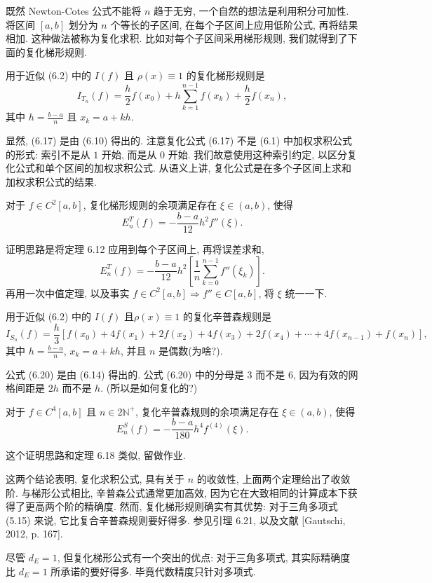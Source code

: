 \documentclass[a4paper]{ctexart}
\newcommand{\hl}[1]
{\noindent {\bf {#1}}}
\begin{document}
{既然 Newton-Cotes 公式不能将 $n$ 趋于无穷, 一个自然的想法是利用积分可加性. 
将区间 $[a, b]$ 划分为 $n$ 个等长的子区间, 在每个子区间上应用低阶公式, 再将结果相加. 这种做法被称为复化求积. 
比如对每个子区间采用梯形规则, 我们就得到了下面的复化梯形规则.

\hl{定义6.17} 用于近似 (6.2) 中的 $I(f)$ 且 $\rho(x) \equiv 1$ 的复化梯形规则是
$$
I_{T_n}(f) = \frac{h}{2} f(x_0) + h \sum_{k=1}^{n-1} f(x_k) + \frac{h}{2} f(x_n), 
$$
其中 $h = \frac{b - a}{n}$ 且 $x_k = a + kh$.

显然, (6.17) 是由 (6.10) 得出的. 注意复化公式 (6.17) 不是 (6.1) 中加权求积公式的形式: 
索引不是从 $1$ 开始, 而是从 $0$ 开始. 我们故意使用这种索引约定, 以区分复化公式和单个区间的加权求积公式. 
从语义上讲, 复化公式是在多个子区间上求和加权求积公式的结果. 

\hl{定理6.18} 对于 $f \in C^2[a, b]$, 复化梯形规则的余项满足存在 $\xi \in (a, b)$, 使得
$$ 
E^T_n(f) = -\frac{b - a}{12}h^2 f''(\xi). 
$$

证明思路是将定理 6.12 应用到每个子区间上, 再将误差求和, 
$$
E^T_n(f) = -\frac{b - a}{12}h^2 \left[ \frac{1}{n} \sum_{k=0}^{n-1} f''(\xi_k) \right]. 
$$
再用一次中值定理, 以及事实 $f \in C^2[a, b] \Rightarrow f'' \in C[a, b]$, 
将 $\xi$ 统一一下.

\hl{定义6.19} 用于近似 (6.2) 中的 $I(f)$ 且$\rho(x) \equiv 1$ 的复化辛普森规则是
$$ 
I_{S_n}(f) 
= \frac{h}{3} \left[ f(x_0) + 4f(x_1) + 2f(x_2) + 4f(x_3) + 2f(x_4) 
+ \cdots + 4f(x_{n-1}) + f(x_n) \right], 
$$
其中 $h = \frac{b - a}{n}$, $x_k = a + kh$, 并且 $n$ 是偶数(为啥?).

公式 (6.20) 是由 (6.14) 得出的. 公式 (6.20) 中的分母是 $3$ 而不是 $6$, 
因为有效的网格间距是 $2h$ 而不是 $h$. (所以是如何复化的?)

\hl{定理6.20} 对于 $f \in C^4[a, b]$ 且 $n \in 2\mathbb{N}^+$, 
复化辛普森规则的余项满足存在 $\xi \in (a, b)$, 使得
$$ 
E^S_n(f) = -\frac{b - a}{180}h^4 f^{(4)}(\xi). 
$$

这个证明思路和定理 6.18 类似, 留做作业. 

这两个结论表明, 复化求积公式, 具有关于 $n$ 的收敛性, 上面两个定理给出了收敛阶.
与梯形公式相比, 辛普森公式通常更加高效, 因为它在大致相同的计算成本下获得了更高两个阶的精确度. 
然而, 复化梯形规则确实有其优势: 对于三角多项式 (5.15) 来说, 它比复合辛普森规则要好得多. 
参见引理 6.21, 以及文献 [Gautschi, 2012, p. 167].

尽管 $d_E = 1$, 但复化梯形公式有一个突出的优点: 对于三角多项式, 其实际精确度比 $d_E = 1$ 
所承诺的要好得多. 毕竟代数精度只针对多项式.

}
\end{document}
